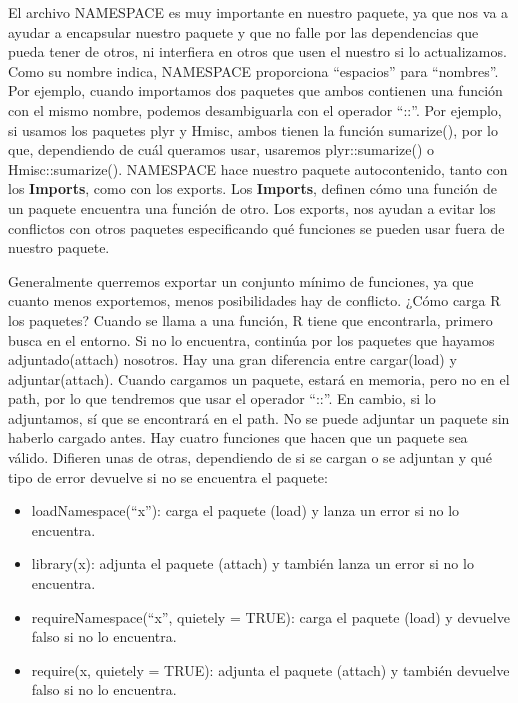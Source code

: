 El archivo NAMESPACE es muy importante en nuestro paquete, ya que nos va a ayudar a
encapsular nuestro paquete y que no falle por las dependencias que pueda tener de otros, ni
interfiera en otros que usen el nuestro si lo actualizamos.
Como su nombre indica, NAMESPACE proporciona “espacios” para “nombres”. Por ejemplo,
cuando importamos dos paquetes que ambos contienen una funci\'on con el mismo nombre,
podemos desambiguarla con el operador “::”. Por ejemplo, si usamos los paquetes plyr y
Hmisc, ambos tienen la funci\'on sumarize(), por lo que, dependiendo de cu\'al queramos usar,
usaremos plyr::sumarize() o Hmisc::sumarize().
NAMESPACE hace nuestro paquete autocontenido, tanto con los \textbf{Imports}, como con los
exports. Los \textbf{Imports}, definen c\'omo una funci\'on de un paquete encuentra una funci\'on de
otro. Los exports, nos ayudan a evitar los conflictos con otros paquetes especificando qu\'e
funciones se pueden usar fuera de nuestro paquete.

Generalmente querremos exportar un conjunto m\'inimo de funciones, ya que cuanto menos
exportemos, menos posibilidades hay de conflicto.
¿C\'omo carga R los paquetes?
Cuando se llama a una funci\'on, R tiene que encontrarla, primero busca en el entorno. Si no
lo encuentra, contin\'ua por los paquetes que hayamos adjuntado(attach) nosotros.
Hay una gran diferencia entre cargar(load) y adjuntar(attach).
Cuando cargamos un paquete, estar\'a en memoria, pero no en el path, por lo que tendremos
que usar el operador “::”. En cambio, si lo adjuntamos, s\'i que se encontrar\'a en el path. No
se puede adjuntar un paquete sin haberlo cargado antes.
Hay cuatro funciones que hacen que un paquete sea v\'alido. Difieren unas de otras,
dependiendo de si se cargan o se adjuntan y qu\'e tipo de error devuelve si no se encuentra el
paquete:

\begin{itemize}
    \item loadNamespace(“x”): carga el paquete (load) y lanza un error si no lo encuentra.
    \item library(x): adjunta el paquete (attach) y tambi\'en lanza un error si no lo encuentra.
    \item requireNamespace(“x”, quietely = TRUE): carga el paquete (load) y devuelve falso
si no lo encuentra.
    \item require(x, quietely = TRUE): adjunta el paquete (attach) y tambi\'en devuelve falso si
no lo encuentra.
\end{itemize}

